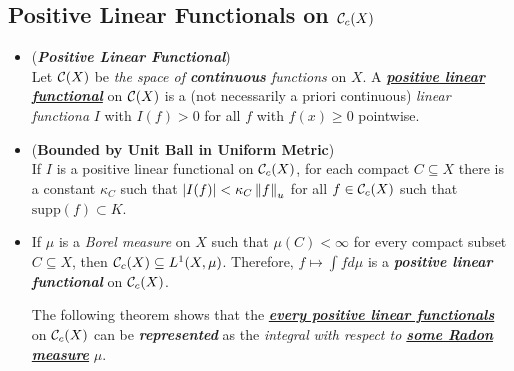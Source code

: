 \documentclass[11pt]{article}
\begin{document}
\subsection{Positive Linear Functionals on ${\mathcal C}_c(X)$}
\begin{itemize}
\item \begin{definition} (\emph{\textbf{Positive Linear Functional}})\\
Let ${\mathcal C}(X)$ be \emph{the space of \textbf{continuous} functions} on $X$. A \underline{\textbf{\emph{positive linear functional}}} on ${\mathcal C}(X)$ is a (not necessarily a 
priori continuous) \emph{linear functiona} $I$ with $I(f) > 0$ for all $f$  with $f(x) \ge 0$ pointwise. 
\end{definition}

\item \begin{lemma} (\textbf{Bounded by Unit Ball in Uniform Metric}) \citep{folland2013real}\\
If $I$ is a positive linear functional on ${\mathcal C}_{c}(X)$, for each compact $C \subseteq X$ there is a constant $\kappa_{C}$ such that $\left\lvert I(f) \right\rvert < \kappa_C\left\|f\right\|_{u}$ for all $f \in {\mathcal C}_{c}(X)$ such that $\text{supp}(f) \subset K$.
\end{lemma}


\item \begin{remark}
If $\mu$ is a \emph{Borel measure} on $X$ such that $\mu(C) < \infty$ for every compact subset $C \subseteq X$, then ${\mathcal C}_c(X) \subseteq L^1(X, \mu)$. Therefore, $f \mapsto \int f d\mu$ is a \emph{\textbf{positive linear functional}} on ${\mathcal C}_c(X)$.

The following theorem shows that the \underline{\emph{\textbf{every positive linear functionals}}} on ${\mathcal C}_c(X)$ can be \emph{\textbf{represented}} as the \emph{integral} \emph{with respect to \underline{\textbf{some Radon measure}}} $\mu$.
\end{remark}


\end{itemize}
\end{document}
